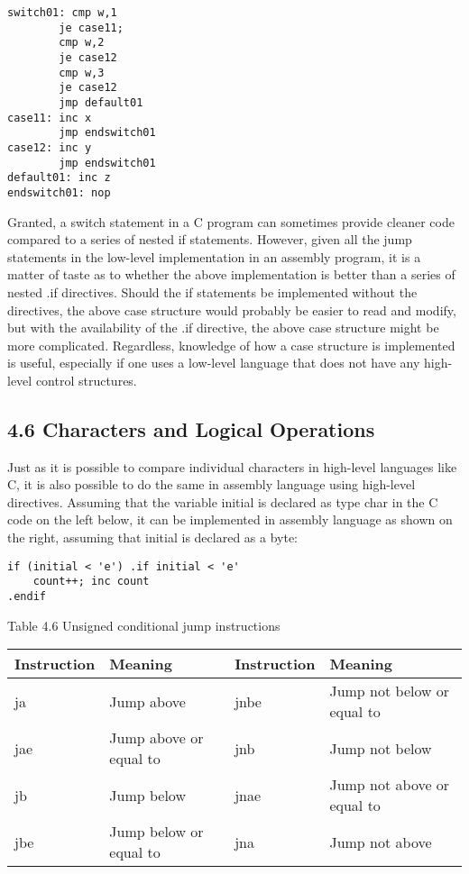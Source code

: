 \documentclass[10pt]{article}
\begin{document}
\begin{verbatim}
switch01: cmp w,1
        je case11;
        cmp w,2
        je case12
        cmp w,3
        je case12
        jmp default01
case11: inc x
        jmp endswitch01
case12: inc y
        jmp endswitch01
default01: inc z
endswitch01: nop
\end{verbatim}

Granted, a switch statement in a C program can sometimes provide cleaner code compared to a series of nested if statements. However, given all the jump statements in the low-level implementation in an assembly program, it is a matter of taste as to whether the above implementation is better than a series of nested .if directives. Should the if statements be implemented without the directives, the above case structure would probably be easier to read and modify, but with the availability of the .if directive, the above case structure might be more complicated. Regardless, knowledge of how a case structure is implemented is useful, especially if one uses a low-level language that does not have any high-level control structures.

\subsection*{4.6 Characters and Logical Operations}
Just as it is possible to compare individual characters in high-level languages like C, it is also possible to do the same in assembly language using high-level directives. Assuming that the variable initial is declared as type char in the C code on the left below, it can be implemented in assembly language as shown on the right, assuming that initial is declared as a byte:

\begin{verbatim}
if (initial < 'e') .if initial < 'e'
    count++; inc count
.endif
\end{verbatim}

Table 4.6 Unsigned conditional jump instructions

\begin{center}
\begin{tabular}{|l|l|l|l|}
\hline
Instruction & Meaning & Instruction & Meaning \\
\hline
ja & Jump above & jnbe & Jump not below or equal to \\
\hline
jae & Jump above or equal to & jnb & Jump not below \\
\hline
jb & Jump below & jnae & Jump not above or equal to \\
\hline
jbe & Jump below or equal to & jna & Jump not above \\
\hline
\end{tabular}
\end{center}
\end{document}
